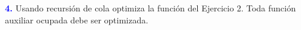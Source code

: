 \newpage
\textbf{\textcolor{blue}{4.}} \Large
Usando recursión de cola optimiza la función del Ejercicio 2. Toda función auxiliar ocupada
debe ser optimizada.\\
